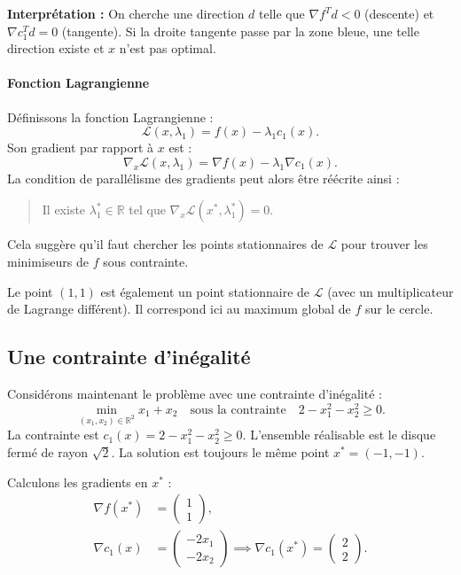 \begin{figureexplanation}
\textbf{Interprétation :} On cherche une direction $d$ telle que $\nabla f^T d < 0$ (descente) et $\nabla c_1^T d = 0$ (tangente). Si la droite tangente passe par la zone bleue, une telle direction existe et $x$ n'est pas optimal.
\end{figureexplanation}

\paragraph{Fonction Lagrangienne}
Définissons la fonction Lagrangienne :
\begin{equation}
    \mathcal{L}(x, \lambda_1) = f(x) - \lambda_1 c_1(x).
\end{equation}
Son gradient par rapport à $x$ est :
\begin{equation}
    \nabla_x \mathcal{L}(x, \lambda_1) = \nabla f(x) - \lambda_1 \nabla c_1(x).
\end{equation}
La condition de parallélisme des gradients peut alors être réécrite ainsi :
\begin{quote}
Il existe $\lambda_1^* \in \mathbb{R}$ tel que $\nabla_x \mathcal{L}(x^*, \lambda_1^*) = 0$.
\end{quote}
Cela suggère qu'il faut chercher les points stationnaires de $\mathcal{L}$ pour trouver les minimiseurs de $f$ sous contrainte.

\begin{remarque}
Le point $(1, 1)$ est également un point stationnaire de $\mathcal{L}$ (avec un multiplicateur de Lagrange différent). Il correspond ici au maximum global de $f$ sur le cercle.
\end{remarque}

\subsection{Une contrainte d'inégalité}

Considérons maintenant le problème avec une contrainte d'inégalité :
\begin{equation}
    \min_{(x_1, x_2) \in \mathbb{R}^2} x_1 + x_2 \quad \text{sous la contrainte} \quad 2 - x_1^2 - x_2^2 \geq 0.
\end{equation}
La contrainte est $c_1(x) = 2 - x_1^2 - x_2^2 \geq 0$. L'ensemble réalisable est le disque fermé de rayon $\sqrt{2}$. La solution est toujours le même point $x^* = (-1, -1)$.

Calculons les gradients en $x^*$ :
\begin{align*}
    \nabla f(x^*) &= \begin{pmatrix} 1 \\ 1 \end{pmatrix}, \\
    \nabla c_1(x) &= \begin{pmatrix} -2x_1 \\ -2x_2 \end{pmatrix} \implies \nabla c_1(x^*) = \begin{pmatrix} 2 \\ 2 \end{pmatrix}.
\end{align*}

